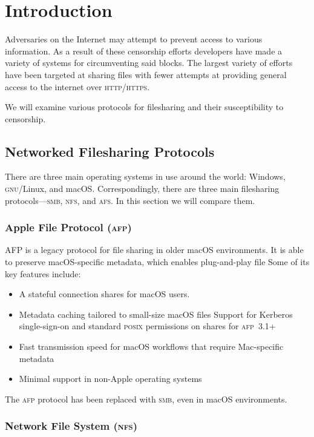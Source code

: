 \section{Introduction}\label{sec:intro}

Adversaries on the Internet may attempt to prevent access to various
information. As a result of these censorship efforts developers have made a
variety of systems for circumventing said blocks. The largest variety of efforts
have been targeted at sharing files with fewer attempts at providing general
access to the internet over \textsc{http}/\textsc{https}.

We will examine various protocols for filesharing and their susceptibility to
censorship.

\subsection{Networked Filesharing Protocols}

There are three main operating systems in use around the world: Windows,
\textsc{gnu}/Linux, and macOS. Correspondingly, there are three main filesharing
protocols---\textsc{smb}, \textsc{nfs}, and \textsc{afs}. In this section we will
compare them.

\subsubsection{Apple File Protocol (\textsc{afp})}

AFP is a legacy protocol for file sharing in older macOS environments. It is
able to preserve macOS-specific metadata, which enables plug-and-play file
Some of its key features include\cite{eriksenCOMPARISONNFSSAMBA}:
\begin{itemize}[nosep]
    \item A stateful connection shares for macOS users.
    \item Metadata caching tailored to small-size macOS files Support for
          Kerberos single-sign-on and standard \textsc{posix} permissions on
          shares for \textsc{afp}~3.1+
    \item Fast transmission speed for macOS workflows that require Mac-specific
          metadata
    \item Minimal support in non-Apple operating systems
\end{itemize}
The \textsc{afp} protocol has been replaced with \textsc{smb}, even in macOS
environments.

\subsubsection{Network File System (\textsc{nfs})}

